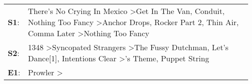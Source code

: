 \begin{supertabular}{p{0.03\textwidth}p{0.92\textwidth}}
 \textbf{S1}:  &  There's No Crying In Mexico\textsuperscript{} \textgreater \enspace Get In The Van\textsuperscript{}, \enspace Conduit\textsuperscript{}, \enspace Nothing Too Fancy\textsuperscript{} \textgreater \enspace Anchor Drops\textsuperscript{}, \enspace Rocker Part 2\textsuperscript{}, \enspace Thin Air\textsuperscript{}, \enspace Comma Later\textsuperscript{} \textgreater \enspace Nothing Too Fancy\textsuperscript{}  \enspace  \\
 \textbf{S2}:  &                                                                                           1348\textsuperscript{} \textgreater \enspace Syncopated Strangers\textsuperscript{} \textgreater \enspace The Fussy Dutchman\textsuperscript{}, \enspace Let's Dance[1]\textsuperscript{}, \enspace Intentions Clear\textsuperscript{} \textgreater {}'s Theme\textsuperscript{}, \enspace Puppet String\textsuperscript{}  \enspace  \\
 \textbf{E1}:  &                                                                                                                                                                                                                                                                                                                                                        Prowler\textsuperscript{} \textgreater {}\textsuperscript{}  \enspace  \\
\end{supertabular}
